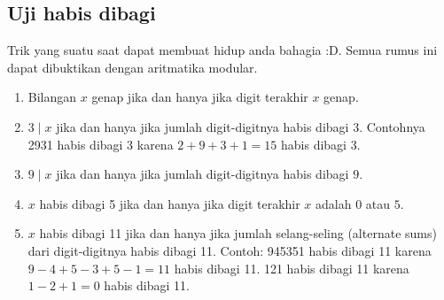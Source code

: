 \subsection{Uji habis dibagi}
    Trik yang suatu saat dapat membuat hidup anda bahagia :D. Semua rumus ini dapat dibuktikan dengan aritmatika modular.
    \begin{enumerate}
        \item Bilangan $x$ genap jika dan hanya jika digit terakhir $x$ genap.
        \item $3 \mid x$ jika dan hanya jika jumlah digit-digitnya habis dibagi $3$. Contohnya 2931 habis dibagi 3 karena $2+9+3+1=15$ habis dibagi 3.
        \item $9 \mid x$ jika dan hanya jika jumlah digit-digitnya habis dibagi $9$.
        \item $x$ habis dibagi 5 jika dan hanya jika digit terakhir $x$ adalah $0$ atau $5$.
        \item $x$ habis dibagi 11 jika dan hanya jika jumlah selang-seling (alternate sums) dari digit-digitnya habis dibagi 11. Contoh: 945351 habis dibagi 11 karena $9-4+5-3+5-1=11$ habis dibagi 11. 121 habis dibagi 11 karena $1-2+1=0$ habis dibagi 11.
    \end{enumerate}


    
